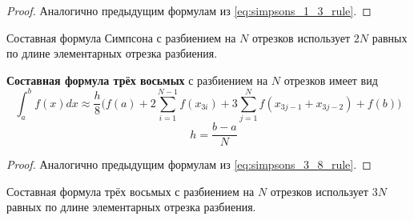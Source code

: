 \documentclass[../main.tex]{subfile}
\begin{document}
\begin{proof}
	Аналогично предыдущим формулам из \eqref{eq:simpsons_1_3_rule}.
\end{proof}

\begin{remark}
	Составная формула Симпсона с разбиением на $N$ отрезков использует $2N$
	равных по длине элементарных отрезка разбиения.
\end{remark}
\newpage

\begin{theorem}
	\textbf{Составная формула трёх восьмых} с разбиением на $N$ отрезков
	имеет вид
	\[\boxed{\int_a^b f(x)dx\approx \frac{h}{8}\Big(f(a)+2\sum_{i=1}^{N-1}
	f(x_{3i})+3\sum_{j=1}^{N}f(x_{3j-1}+x_{3j-2})+f(b)\Big)}\]
	\[\quad h=\frac{b-a}{N}\]
\end{theorem}

\begin{proof}
	Аналогично предыдущим формулам из \eqref{eq:simpsons_3_8_rule}.
\end{proof}

\begin{remark}
	Составная формула трёх восьмых с разбиением на $N$ отрезков использует
	$3N$
	равных по длине элементарных отрезка разбиения.
\end{remark}


\end{document}

